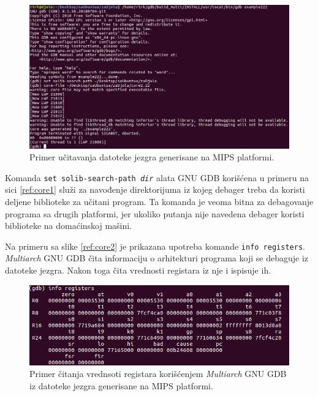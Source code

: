 \documentclass[12pt,oneside]{memoir}
\begin{document}
\begin{figure}[h!]
	\begin{center}
		\includegraphics[scale=0.5]{slike/core1.png}
	\end{center}
	\caption{Primer učitavanja datoteke jezgra generisane na MIPS platformi.}
	\label{fig:core1}
\end{figure}

Komanda \texttt{set solib-search-path \emph{dir}} alata GNU GDB korišćena u primeru na sici \ref{ref:core1} služi za navođenje direktorijuma iz kojeg debager treba da koristi deljene biblioteke za učitani program. Ta komanda je veoma bitna za debagovanje programa sa drugih platformi, jer ukoliko putanja nije navedena debager koristi biblioteke na domaćinskoj mašini.

Na primeru sa slike \ref{ref:core2} je prikazana upotreba komande \texttt{info registers}. \emph{Multiarch} GNU GDB čita informaciju o arhitekturi programa koji se debaguje iz datoteke jezgra. Nakon toga čita vrednosti registara iz nje i ispisuje ih.

\begin{figure}[h!]
	\begin{center}
		\includegraphics[scale=0.5]{slike/core2.png}
	\end{center}
	\caption{Primer čitanja vrednsoti registara korišćenjem \emph{Multiarch} GNU GDB iz datoteke jezgra generisane na MIPS platformi.}
	\label{fig:core2}
\end{figure}
\end{document}

